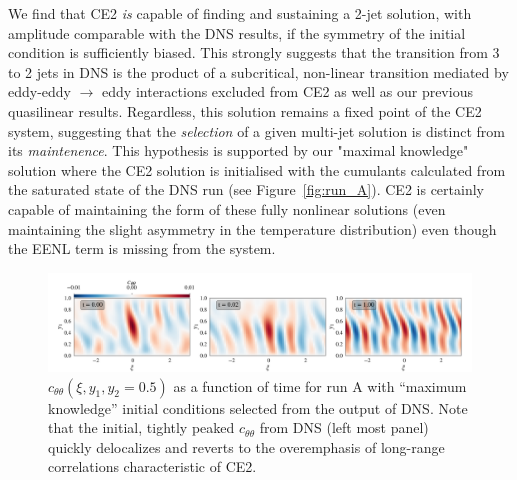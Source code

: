 \documentclass{jfm}
\newcommand{\ctt}{c_{\theta \theta}}
\begin{document}
We find that CE2 \emph{is} capable of finding and sustaining a 2-jet solution, with amplitude comparable with the DNS results, if the symmetry of the initial condition is sufficiently biased.
This strongly suggests that the transition from 3 to 2 jets in DNS is the product of a subcritical, non-linear transition mediated by eddy-eddy $\to$ eddy interactions excluded from CE2 as well as our previous quasilinear results.
Regardless, this solution remains a fixed point of the CE2 system, suggesting that the \emph{selection} of a given multi-jet solution is distinct from its \emph{maintenence}.
This hypothesis is supported by our "maximal knowledge" solution where the CE2 solution is initialised with the cumulants calculated from the saturated state of the DNS run (see Figure~\ref{fig:run_A}). CE2 is certainly capable of maintaining the form of these fully nonlinear solutions (even maintaining the slight asymmetry in the temperature distribution) even though the EENL term is missing from the system.


\begin{figure}
    \centering
    \includegraphics[width=\textwidth]{../../figs/run_A_decoherence.pdf}
    \caption{$\ctt(\xi, y_1, y_2 = 0.5)$ as a function of time for run A with ``maximum knowledge'' initial conditions selected from the output of DNS. Note that the initial, tightly peaked $\ctt$ from DNS (left most panel) quickly delocalizes and reverts to the overemphasis of long-range correlations characteristic of CE2.}
    \label{fig:run_A_decoherence}
\end{figure}
\end{document}
